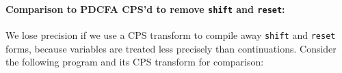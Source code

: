 \paragraph{Comparison to PDCFA CPS'd to remove {\tt shift} and {\tt reset}:}{
We lose precision if we use a CPS transform to compile away {\tt shift} and {\tt reset} forms, because variables are treated less precisely than continuations.
%
%
%
Consider the following program and its CPS transform for comparison:
\begin{small}
\begin{SCodeFlow}\begin{RktBlk}\begin{SingleColumn}\RktPn{(}\mbox{}\RktPn{(}\RktPn{[}\mbox{}\RktPn{(}\RktSym{$\lambda$}\mbox{}\RktPn{(}\RktPn{)}\mbox{}\RktPn{)}\RktPn{]}

\mbox{}\RktPn{[}\mbox{}\RktPn{(}\RktSym{$\lambda$}\mbox{}\RktPn{(}\RktPn{)}\mbox{}\RktPn{(}\mbox{}\mbox{}\RktPn{(}\mbox{}\RktPn{(}\mbox{}\RktPn{)}\RktPn{)}\RktPn{)}\RktPn{)}\RktPn{]}

\mbox{}\RktPn{[}\mbox{}\RktPn{(}\RktSym{$\lambda$}\mbox{}\RktPn{(}\RktPn{)}\mbox{}\RktPn{(}\mbox{}\RktPn{(}\mbox{}\RktPn{(}\mbox{}\RktPn{)}\RktPn{)}\RktPn{)}\RktPn{)}\RktPn{]}\RktPn{)}


\end{SingleColumn}
\end{RktBlk}
\end{SCodeFlow}
\end{small}}
